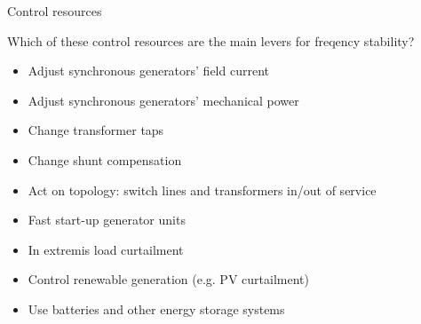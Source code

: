 \begin{frame}{Control resources}

    Which of these control resources are the main levers for freqency stability?
      \begin{itemize}
          \item Adjust synchronous generators' field current
          \item \alert{Adjust synchronous generators' mechanical power}
          \item Change transformer taps
          \item Change shunt compensation
          \item Act on topology: switch lines and transformers in/out of service
          \item \alert{Fast start-up generator units}
          \item \alert{In extremis load curtailment}
          \item \alert{Control renewable generation (e.g. PV curtailment)}
          \item \alert{Use batteries and other energy storage systems} %
      \end{itemize}
\end{frame}